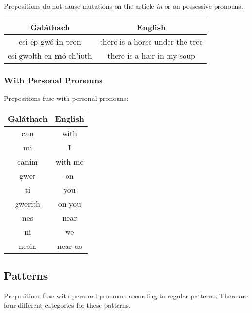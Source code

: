Prepositions do not cause mutations on the article \textit{in} or on possessive pronouns.
\begin{table}[H]
\centering
\begin{tabular}{c|c}
  \textbf{Gal\'{a}thach} & \textbf{English}\\
  \toprule
  esi \'{e}p gw\'{o} \textbf{i}n pren & there is a horse under the tree\\
  esi gwolth en \textbf{m}\'{o} ch'iuth & there is a hair in my soup
\end{tabular}
\label{examples_prepositions_no_mutation_on_in}
\end{table}

\subsubsection{With Personal Pronouns}

Prepositions fuse with personal pronouns:
\begin{table}[H]
\centering
\begin{tabular}{c|c}
  \textbf{Gal\'{a}thach} & \textbf{English}\\
  \toprule
  can & with\\
  mi & I\\
  canim & with me\\
  \midrule
  gwer & on\\
  ti & you\\
  gwerith & on you\\
  \midrule
  nes & near\\
  ni & we\\
  nesin & near us
\end{tabular}
\label{examples_prepositions_fusing}
\end{table}

\subsection{Patterns}

Prepositions fuse with personal pronouns according to regular patterns. There are four different categories for these patterns.


